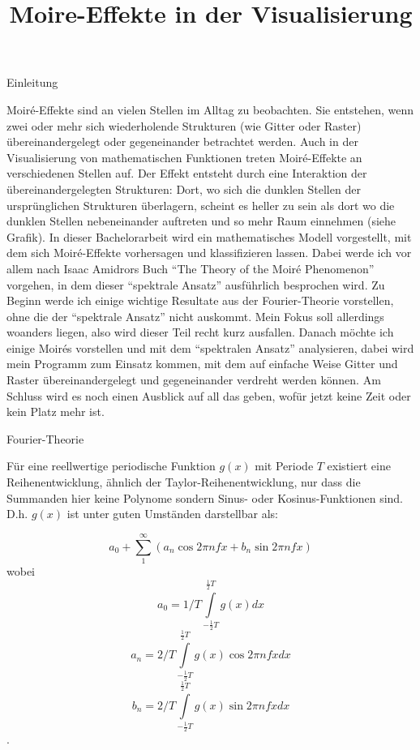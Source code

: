 \documentclass[a4paper]{article}
\begin{document}
\title{Moire-Effekte in der Visualisierung}
\date{}
\maketitle
\thispagestyle{empty}
\setlength{\parskip}{6pt}

Einleitung

Moiré-Effekte sind an vielen Stellen im Alltag zu beobachten. Sie entstehen, wenn zwei oder mehr sich wiederholende Strukturen (wie Gitter oder Raster) übereinandergelegt oder gegeneinander betrachtet werden.  
Auch in der Visualisierung von mathematischen Funktionen treten Moiré-Effekte an verschiedenen Stellen auf.
Der Effekt entsteht durch eine Interaktion der übereinandergelegten Strukturen: Dort, wo sich die dunklen Stellen der ursprünglichen Strukturen überlagern, scheint es heller zu sein als dort wo die dunklen Stellen nebeneinander auftreten und so mehr Raum einnehmen (siehe Grafik).
In dieser Bachelorarbeit wird ein mathematisches Modell vorgestellt, mit dem sich Moiré-Effekte vorhersagen und klassifizieren lassen. Dabei werde ich vor allem nach Isaac Amidrors Buch “The Theory of the Moiré Phenomenon” vorgehen, in dem dieser “spektrale Ansatz” ausführlich besprochen wird.
Zu Beginn werde ich einige wichtige Resultate aus der Fourier-Theorie vorstellen, ohne die der “spektrale Ansatz” nicht auskommt. Mein Fokus soll allerdings woanders liegen, also wird dieser Teil recht kurz ausfallen. Danach möchte ich einige Moirés vorstellen und mit dem “spektralen Ansatz” analysieren, dabei wird mein Programm zum Einsatz kommen, mit dem auf einfache Weise Gitter und Raster übereinandergelegt und gegeneinander verdreht werden können.
Am Schluss wird es noch einen Ausblick auf all das geben, wofür jetzt keine Zeit oder kein Platz mehr ist.

Fourier-Theorie

Für eine reellwertige periodische Funktion $g(x)$ mit Periode $T$ existiert eine Reihenentwicklung, ähnlich der Taylor-Reihenentwicklung, nur dass die Summanden hier keine Polynome sondern Sinus- oder Kosinus-Funktionen sind. D.h. $g(x)$ ist unter guten Umständen darstellbar als:

$$ a_0+\sum\limits_{1}^{\infty}(a_n \cos 2\pi nfx + b_n \sin 2\pi nfx)$$
wobei
$$ a_0=1/T \int\limits_{-\frac{1}{2}T}^{\frac{1}{2}T}g(x)dx$$
$$ a_n=2/T \int\limits_{-\frac{1}{2}T}^{\frac{1}{2}T}g(x) \cos 2\pi nfx dx$$
$$ b_n=2/T \int\limits_{-\frac{1}{2}T}^{\frac{1}{2}T}g(x) \sin 2\pi nfx dx$$. %
\end{document}
